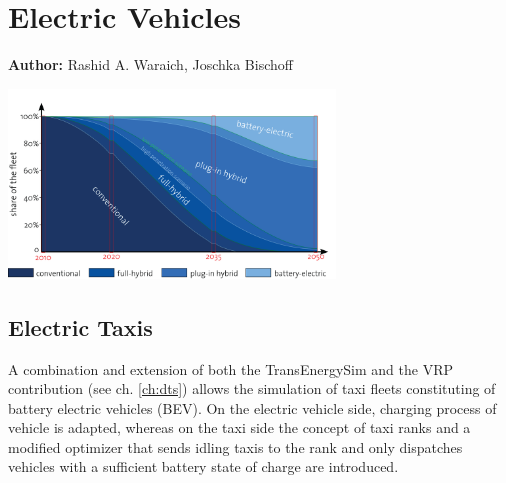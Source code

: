 \chapter{Electric Vehicles }
\label{ch:elvehicles}

\hfill \textbf{Author:} Rashid A. Waraich, Joschka Bischoff

\begin{center} \includegraphics[width=0.65\textwidth, angle=0]{extending/figures/Elvehicles/main.png} \end{center}


\section{Electric Taxis} 
A combination and extension of both the TransEnergySim and the VRP contribution (see ch. \ref{ch:dts}) allows the simulation of taxi fleets constituting of battery electric vehicles (BEV).
On the electric vehicle side, charging process of vehicle is adapted, whereas on the taxi side the concept of taxi ranks and a modified optimizer that sends idling taxis to the rank and only dispatches vehicles with a sufficient battery state of charge are introduced. 
